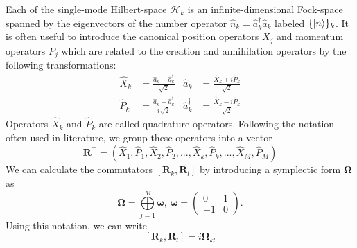 \documentclass[12pt, a4paper,  nobibnotes]{article}
\newcommand{\op}[1]{\hat{#1}}
\begin{document}
Each of the single-mode Hilbert-space $\mathcal H_k$ is an infinite-dimensional Fock-space spanned by the eigenvectors 
of the number operator $\op n_k = \op a_k^\dagger \op a_k$ labeled $\{\ket{n}\}_k$.
It is often useful to introduce the canonical position operators $X_j$ and momentum operators $P_j$ which are related to the creation and annihilation operators
by the following transformations:
\begin{align}
  \op X_k &= \frac{\op a_k+\op a_k^\dagger}{\sqrt{2}}  & \op a_k &= \frac{\op X_k + i\op P_k}{\sqrt{2}}  \\ 
  \op P_k &= \frac{\op a_k-\op a_k^\dagger}{i\sqrt{2}} & \op a_k^\dagger &= \frac{\op X_k - i\op P_k}{\sqrt{2}}
   \label{eq:jwtransform}
\end{align}
Operators $\op X_k$ and $\op P_k$ are called quadrature operators. Following the notation often used in literature, we group these operators into a vector 
\begin{equation}
    \mathbf R^\top = (\op X_1, \op P_1, \op X_2, \op P_2, ..., \op X_k, \op P_k, ..., \op X_M, \op P_M)
    \label{eq:xidef}
\end{equation}
We can calculate the commutators $\left[\mathbf R_k,\mathbf R_l\right]$ by introducing a symplectic form $\pmb\Omega$ as
\begin{equation}
    \pmb\Omega = \bigoplus\limits_{j=1}^{M}\pmb\omega,~\pmb\omega = 
    \begin{pmatrix}
    0 & 1 \\
    -1 & 0
    \end{pmatrix}.
\end{equation}
Using this notation, we can write
\begin{equation}
    \left[\mathbf R_k,\mathbf R_l\right] = i\pmb\Omega_{kl}
\end{equation}
\end{document}
